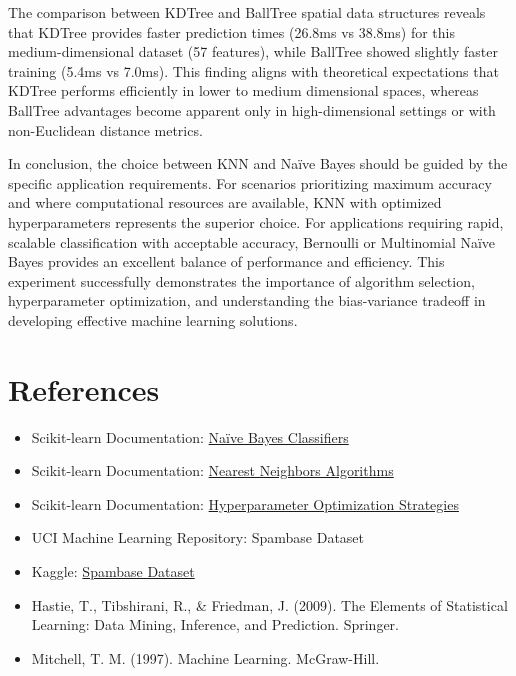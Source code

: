 \documentclass[11pt]{article}
\begin{document}
The comparison between KDTree and BallTree spatial data structures reveals that KDTree provides faster prediction times (26.8ms vs 38.8ms) for this medium-dimensional dataset (57 features), while BallTree showed slightly faster training (5.4ms vs 7.0ms). This finding aligns with theoretical expectations that KDTree performs efficiently in lower to medium dimensional spaces, whereas BallTree advantages become apparent only in high-dimensional settings or with non-Euclidean distance metrics.

In conclusion, the choice between KNN and Na\"ive Bayes should be guided by the specific application requirements. For scenarios prioritizing maximum accuracy and where computational resources are available, KNN with optimized hyperparameters represents the superior choice. For applications requiring rapid, scalable classification with acceptable accuracy, Bernoulli or Multinomial Na\"ive Bayes provides an excellent balance of performance and efficiency. This experiment successfully demonstrates the importance of algorithm selection, hyperparameter optimization, and understanding the bias-variance tradeoff in developing effective machine learning solutions.

\section*{References}
\begin{itemize}
    \item Scikit-learn Documentation: \href{https://scikit-learn.org/stable/modules/naive_bayes.html}{Na\"ive Bayes Classifiers}
    \item Scikit-learn Documentation: \href{https://scikit-learn.org/stable/modules/neighbors.html}{Nearest Neighbors Algorithms}
    \item Scikit-learn Documentation: \href{https://scikit-learn.org/stable/modules/grid_search.html}{Hyperparameter Optimization Strategies}
    \item UCI Machine Learning Repository: Spambase Dataset
    \item Kaggle: \href{https://www.kaggle.com/datasets/somesh24/spambase}{Spambase Dataset}
    \item Hastie, T., Tibshirani, R., \& Friedman, J. (2009). The Elements of Statistical Learning: Data Mining, Inference, and Prediction. Springer.
    \item Mitchell, T. M. (1997). Machine Learning. McGraw-Hill.
\end{itemize}
\end{document}
